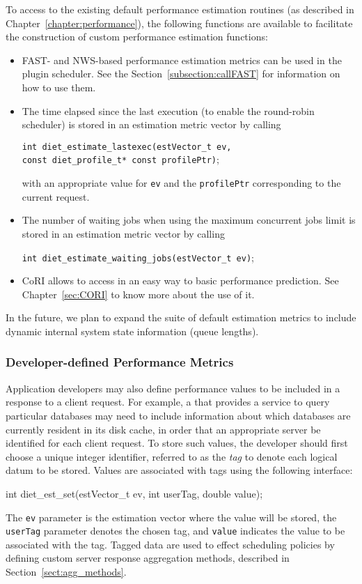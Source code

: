 To access to the existing default performance estimation
routines (as described in Chapter~\ref{chapter:performance}), the following
functions are available to facilitate the construction of custom
performance estimation functions:
\begin{itemize}
\item FAST- and NWS-based performance estimation metrics can be used in the plugin scheduler. 
  See the Section~\ref{subsection:callFAST} for information on how to use them.
\item The time elapsed since the last execution (to enable
  the round-robin scheduler) is stored in an estimation metric vector
  by calling
  \begin{tabbing}
    \texttt{int diet\_estimate\_lastexec(}\=\texttt{estVector\_t ev,} \\
    \> \texttt{const diet\_profile\_t* const profilePtr)};
  \end{tabbing}
  with an appropriate value for \texttt{ev} and the
  \texttt{profilePtr} corresponding to the current \diet request.
\item The number of waiting jobs when using the maximum concurrent jobs
  limit is stored in an estimation metric vector by calling
  \begin{tabbing}
    \texttt{int diet\_estimate\_waiting\_jobs(}\=\texttt{estVector\_t ev)};
  \end{tabbing}
\item CoRI allows to access in an easy way to basic performance 
prediction. See Chapter~\ref{sec:CORI} to know more about the use of it.

\end{itemize}

In the future, we plan to expand the suite of default estimation
metrics to include dynamic internal \diet system state information
(\eg queue lengths).

\subsubsection{Developer-defined Performance Metrics}

Application developers may also define performance values to be
included in a \sed response to a client request.  For example, a \diet
\sed that provides a service to query particular databases may need to
include information about which databases are currently resident in
its disk cache, in order that an appropriate server be identified for
each client request.  To store such values, the \sed developer should
first choose a unique integer identifier, referred to as the
\emph{tag} to denote each logical datum to be stored.  Values are
associated with tags using the following interface:
\begin{code}
int diet\_est\_set(estVector\_t ev, int userTag, double value);
\end{code}
The \texttt{ev} parameter is the estimation vector where the
value will be stored, the \texttt{userTag} parameter denotes the
chosen tag, and \texttt{value} indicates the value to be associated
with the tag.  Tagged data are used to effect
scheduling policies by defining custom server response
aggregation methods, described in Section~\ref{sect:agg_methods}.

